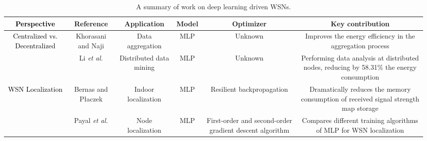 \documentclass[journal,comsoc,letter]{IEEEtran}
\newcommand{\rev}[1]{\textcolor{black}{#1}}
\begin{document}
\begin{table*}[h!]
\centering
\caption{A summary of work on deep learning driven WSNs.}
\label{tab:wsn}
\begin{tabular}{|c|C{2CM}|C{3CM}|C{1.5CM}|C{2CM}|C{3.8CM}|}
\hline
\rev{\textbf{Perspective}}                            & \textbf{Reference}                                           & \textbf{Application}                                                                                   & \textbf{Model}                               & \textbf{Optimizer}                                            & \textbf{Key contribution}                                                                                                                           \\ \hline
\multirow{2}{*}{\rev{Centralized vs. Decentralized}} & Khorasani and Naji \cite{khorasani2017energy}                & Data aggregation                                                                                       & MLP                                          & Unknown                                                       & Improves the energy efficiency in the aggregation process                                                                                           \\  
                                                     & Li \emph{et al.} \cite{li2015distributed}                    & Distributed data mining                                                                                & MLP                                          & Unknown                                                       & Performing data analysis at distributed nodes, reducing by 58.31\% the energy consumption                                                           \\ \hline
\multirow{7}{*}{\rev{WSN Localization}}               & Bernas and P{\l}aczek \cite{bernas2015fully}                 & Indoor localization                                                                                    & MLP                                          & Resilient backpropagation                                     & Dramatically reduces the memory consumption of received signal strength map storage                                                                 \\  
                                                     & Payal \emph{et al.} \cite{payal2015analysis}                 & Node localization                                                                                      & MLP                                          & First-order and second-order gradient descent algorithm       & Compares different training algorithms of MLP for WSN localization                                                                                  \\  

\end{tabular}
\end{table*}
\end{document}
